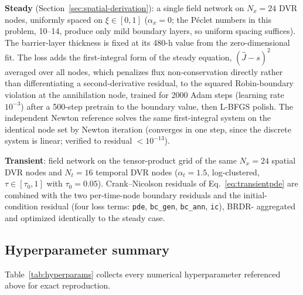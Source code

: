 \textbf{Steady} (Section~\ref{sec:spatial-derivation}): a single field network
on $N_x = 24$ DVR nodes, uniformly spaced on $\xi \in [0,1]$ ($\alpha_x = 0$;
the P\'eclet numbers in this problem, 10--14, produce only mild boundary layers,
so uniform spacing suffices). The barrier-layer thickness is fixed at its 480-h
value from the zero-dimensional fit. The loss adds the first-integral form of
the steady equation, $(\hat{J}-s)^2$ averaged over all nodes, which penalizes
flux non-conservation directly rather than differentiating a second-derivative
residual, to the squared Robin-boundary violation at the annihilation node,
trained for 2000 Adam steps (learning rate $10^{-3}$) after a 500-step pretrain
to the boundary value, then L-BFGS polish. The independent Newton reference
solves the same first-integral system on the identical node set by Newton
iteration (converges in one step, since the discrete system is linear; verified
to residual $<10^{-13}$).

\textbf{Transient}: field network on the tensor-product grid of the
same $N_x=24$ spatial DVR nodes and $N_t=16$ temporal DVR nodes
($\alpha_t=1.5$, log-clustered, $\tau \in [\tau_0, 1]$ with
$\tau_0=0.05$). Crank--Nicolson residuals of
Eq.~\eqref{eq:transientpde} are combined with the two per-time-node
boundary residuals and the initial-condition residual (four loss terms:
\texttt{pde}, \texttt{bc\_gen}, \texttt{bc\_ann}, \texttt{ic}), BRDR-%
aggregated and optimized identically to the steady case.

\subsection{Hyperparameter summary}

Table~\ref{tab:hyperparams} collects every numerical hyperparameter
referenced above for exact reproduction.

